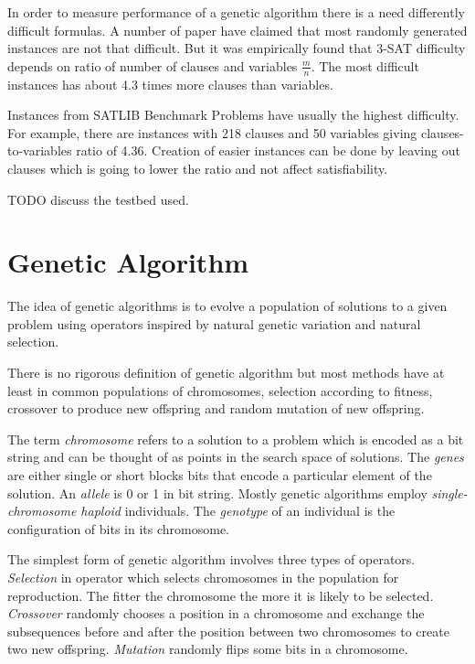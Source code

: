 \documentclass{article}
\begin{document}
In order to measure performance of a genetic algorithm
there is a need differently difficult formulas.
A number of paper have claimed that most randomly generated instances are
not that difficult.
But it was empirically found that 3-SAT difficulty depends on ratio of
number of clauses and variables $\frac{m}{n}$.
The most difficult instances has about 4.3 times more clauses than variables.
\cite{selman1996}

Instances from SATLIB Benchmark Problems have usually the highest difficulty.
For example, there are instances with 218 clauses and 50 variables
giving clauses-to-variables ratio of 4.36.
Creation of easier instances can be done by leaving out clauses
which is going to lower the ratio and not affect satisfiability.

TODO discuss the testbed used.

\section{Genetic Algorithm}

The idea of genetic algorithms is to evolve a population of solutions
to a given problem using operators inspired by natural genetic variation
and natural selection.
\cite{mitchell1996}

There is no rigorous definition of genetic algorithm but most methods
have at least in common populations of chromosomes,
selection according to fitness, crossover to produce new offspring
and random mutation of new offspring.
\cite{mitchell1996}

The term \textit{chromosome} refers to a solution to a problem
which is encoded as a bit string
and can be thought of as points in the search space of solutions.
The \textit{genes} are either single or short blocks bits
that encode a particular element of the solution.
An \textit{allele} is 0 or 1 in bit string.
Mostly genetic algorithms employ \textit{single-chromosome haploid} individuals.
The \textit{genotype} of an individual is the configuration of bits
in its chromosome.
\cite{mitchell1996}

The simplest form of genetic algorithm involves three types of operators.
\textit{Selection} in operator which selects chromosomes in the population for
reproduction.
The fitter the chromosome the more it is likely to be selected.
\textit{Crossover} randomly chooses a position in a chromosome
and exchange the subsequences before and after the position between
two chromosomes to create two new offspring.
\textit{Mutation} randomly flips some bits in a chromosome.
\cite{mitchell1996}
\end{document}
